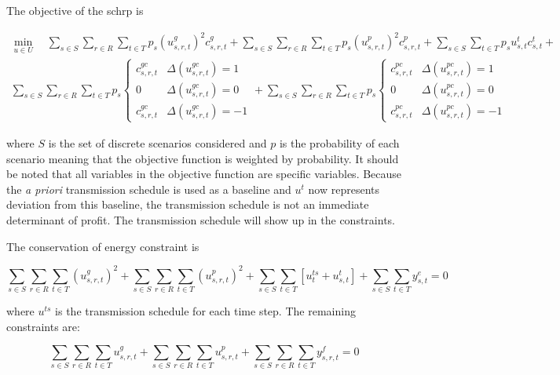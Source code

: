 \documentclass[12pt]{article}
\begin{document}
The objective of the \gls{schrp} is

\begin{gather}
	\min_{u\in U}\quad
	\sum_{s \in S}\sum_{r\in R}\sum_{t\in T}p_s(u_{s,r,t}^{g})^2c_{s,r,t}^{g}+
	\sum_{s \in S}\sum_{r\in R}\sum_{t\in T}p_s(u_{s,r,t}^{p})^2c_{s,r,t}^{p}+
	\sum_{s \in S}\sum_{t\in T}p_su_{s,t}^{t}c_{s,t}^{t}+\\
	\sum_{s \in S}\sum_{r\in R}\sum_{t\in T}p_s\begin{cases}
		c_{s,r,t}^{gc} & \Delta(u_{s,r,t}^{gc})=1\\
		0 & \Delta(u_{s,r,t}^{gc})=0\\
		c_{s,r,t}^{gc} & \Delta(u_{s,r,t}^{gc})=-1
	\end{cases}+
	\sum_{s \in S}\sum_{r\in R}\sum_{t\in T}p_s\begin{cases}
		c_{s,r,t}^{pc} & \Delta(u_{s,r,t}^{pc})=1\\
		0 & \Delta(u_{s,r,t}^{pc})=0\\
		c_{s,r,t}^{pc} & \Delta(u_{s,r,t}^{pc})=-1
	\end{cases}\label{eq:obj}
\end{gather}

where $S$ is the set of discrete scenarios considered and $p$ is the probability of each scenario meaning that the objective function is weighted by probability. It should be noted that all variables in the objective function are specific variables. Because the \textit{a priori} transmission schedule is used as a baseline and $u^t$ now represents deviation from this baseline, the transmission schedule is not an immediate determinant of profit. The transmission schedule will show up in the constraints.

The conservation of energy constraint is

\begin{equation}
	\sum_{s \in S}\sum_{r\in R}\sum_{t\in T}(u_{s,r,t}^{g})^2+
	\sum_{s \in S}\sum_{r\in R}\sum_{t\in T}(u_{s,r,t}^{p})^2+
	\sum_{s \in S}\sum_{t\in T}[u_{t}^{ts}+u_{s,t}^{t}]+
	\sum_{s \in S}\sum_{t\in T}y_{s,t}^{e}=0\label{eq:coe_s}
\end{equation}

where $u^{ts}$ is the transmission schedule for each time step. The remaining constraints are:

\begin{equation}
	\sum_{s \in S}\sum_{r\in R}\sum_{t\in T}u_{s,r,t}^{g}+
	\sum_{s \in S}\sum_{r\in R}\sum_{t\in T}u_{s,r,t}^{p}+
	\sum_{s \in S}\sum_{r\in R}\sum_{t\in T}y_{s,r,t}^{f}=0\label{eq:com_s}
\end{equation}
\end{document}
